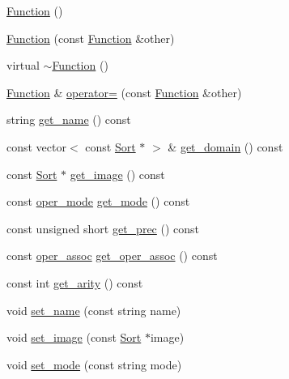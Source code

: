 \begin{CompactItemize}
\item 
\hyperlink{classgenevalmag_1_1Function_88af7b2a3947048e53e0bc9c1d071ad9}{Function} ()
\item 
\hyperlink{classgenevalmag_1_1Function_e598ad6ba742b5d73567c41c3cd4d7bd}{Function} (const \hyperlink{classgenevalmag_1_1Function}{Function} \&other)
\item 
virtual \hyperlink{classgenevalmag_1_1Function_318a1979861665429179979f9d678f3e}{$\sim$Function} ()
\item 
\hyperlink{classgenevalmag_1_1Function}{Function} \& \hyperlink{classgenevalmag_1_1Function_917f09b6aa99038bcae21de7e9e99ad1}{operator=} (const \hyperlink{classgenevalmag_1_1Function}{Function} \&other)
\item 
string \hyperlink{classgenevalmag_1_1Function_ec65653267a5d4cb93f2ce7b5e1c542b}{get\_\-name} () const 
\item 
const vector$<$ const \hyperlink{classgenevalmag_1_1Sort}{Sort} $\ast$ $>$ \& \hyperlink{classgenevalmag_1_1Function_cffc8f2df4197f05e095bc427fb13331}{get\_\-domain} () const 
\item 
const \hyperlink{classgenevalmag_1_1Sort}{Sort} $\ast$ \hyperlink{classgenevalmag_1_1Function_3a0dc4e1734623f53021f0b647c3b0cc}{get\_\-image} () const 
\item 
const \hyperlink{namespacegenevalmag_8e412eca3897f0532c6f1997af777ba4}{oper\_\-mode} \hyperlink{classgenevalmag_1_1Function_6db7c2695f9cce41c24e5cfea7406dd6}{get\_\-mode} () const 
\item 
const unsigned short \hyperlink{classgenevalmag_1_1Function_31272821c5ad532ada3b3d8a988f5891}{get\_\-prec} () const 
\item 
const \hyperlink{namespacegenevalmag_ed96782841eb4586b9e32ce72721d64b}{oper\_\-assoc} \hyperlink{classgenevalmag_1_1Function_e3338db71a289ae4649936bea49dfa5f}{get\_\-oper\_\-assoc} () const 
\item 
const int \hyperlink{classgenevalmag_1_1Function_30fc3347320a9cbeb37b8d45aac3737e}{get\_\-arity} () const 
\item 
void \hyperlink{classgenevalmag_1_1Function_09a0403fa5eac256e223802d6328041e}{set\_\-name} (const string name)
\item 
void \hyperlink{classgenevalmag_1_1Function_b82067b5dfd6d143a12defbf6eb52d56}{set\_\-image} (const \hyperlink{classgenevalmag_1_1Sort}{Sort} $\ast$image)
\item 
void \hyperlink{classgenevalmag_1_1Function_90ff82b99ca7a8bd4795a8c7b6a26ac9}{set\_\-mode} (const string mode)

\end{CompactItemize}
